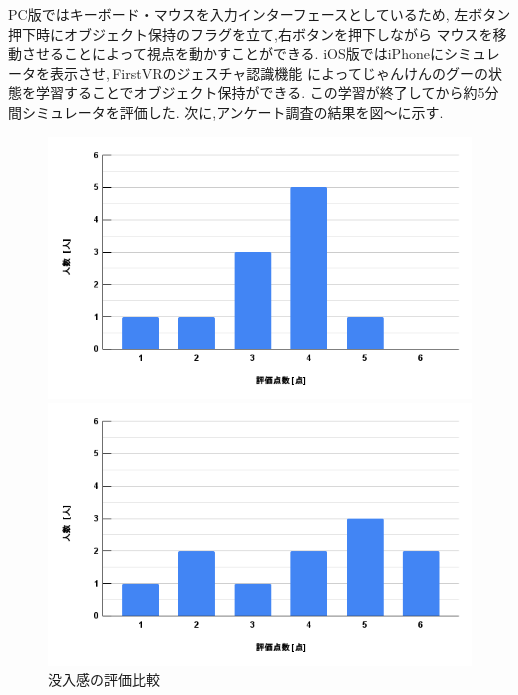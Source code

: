 \documentclass{ltjsreport}
\begin{document}
		PC版ではキーボード・マウスを入力インターフェースとしているため,
		左ボタン押下時にオブジェクト保持のフラグを立て,右ボタンを押下しながら
		マウスを移動させることによって視点を動かすことができる.
		iOS版ではiPhoneにシミュレータを表示させ,\,FirstVRのジェスチャ認識機能
		によってじゃんけんのグーの状態を学習することでオブジェクト保持ができる.
		この学習が終了してから約5分間シミュレータを評価した.
\clearpage
		次に,アンケート調査の結果を図～に示す.

		\begin{figure}[H]
		\centering
		\begin{minipage}{0.45\columnwidth}
		\centering
		\includegraphics[width = \columnwidth]{../figs/PC-1.png}
		\end{minipage}
		\hspace{0.04\columnwidth}
		\begin{minipage}{0.45\columnwidth}
		\centering
		\includegraphics[width = \columnwidth]{../figs/iOS-1.png}
		\end{minipage}
		\caption{没入感の評価比較}
		\label{fig:botunyu}
		\end{figure}
		\vspace{-15pt}
		
\end{document}
